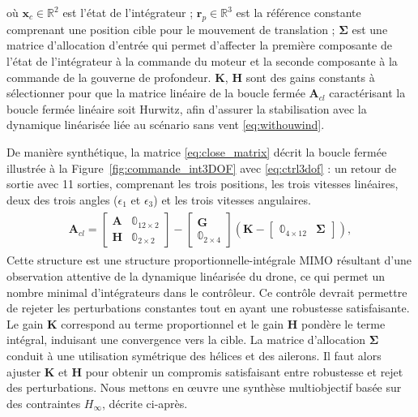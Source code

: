 où $\boldsymbol{x}_{c} \in \mathbb{R}^{2}$ est l'état de l'intégrateur ; $\boldsymbol{r}_{p} \in \mathbb{R}^{3}$ est la référence constante comprenant une position cible pour le mouvement de translation ; $\boldsymbol{\Sigma}$ est une matrice d'allocation d'entrée qui permet d'affecter la première composante de l'état de l'intégrateur à la commande du moteur et la seconde composante à la commande de la gouverne de profondeur. $\boldsymbol{K}$, $\boldsymbol{H}$ sont des gains constants à sélectionner pour que la matrice linéaire de la boucle fermée $\boldsymbol{A}_{cl}$ caractérisant la boucle fermée linéaire soit Hurwitz, afin d'assurer la stabilisation avec la dynamique linéarisée liée au scénario sans vent \eqref{eq:withouwind}.

De manière synthétique, la matrice \eqref{eq:close_matrix} décrit la boucle fermée illustrée à la Figure~\ref{fig:commande_int3DOF} avec \eqref{eq:ctrl3dof} : un retour de sortie avec 11 sorties, comprenant les trois positions, les trois vitesses linéaires, deux des trois angles ($\epsilon_{1}$ et $\epsilon_{3}$) et les trois vitesses angulaires.
\begin{align} \label{eq:close_matrix}
    \begin{gathered}
        \boldsymbol{A}_{cl} \!= \!
        \begin{bmatrix}\boldsymbol{A} & \mathbb{0}_{12\times 2} \\ \boldsymbol{H} & \mathbb{0}_{2\times 2}\end{bmatrix} \!- \!\begin{bmatrix}\boldsymbol{G} \\ \mathbb{0}_{2\times 4}\end{bmatrix} \left( \boldsymbol{K} -  \begin{bmatrix}\mathbb{0}_{4\times 12} & \boldsymbol{\Sigma} \end{bmatrix}\right),
    \end{gathered}
\end{align}
Cette structure est une structure proportionnelle-intégrale MIMO résultant d'une observation attentive de la dynamique linéarisée du drone, ce qui permet un nombre minimal d'intégrateurs dans le contrôleur. Ce contrôle devrait permettre de rejeter les perturbations constantes tout en ayant une robustesse satisfaisante. Le gain $\boldsymbol{K}$ correspond au terme proportionnel et le gain $\boldsymbol{H}$ pondère le terme intégral, induisant une convergence vers la cible. La matrice d'allocation $\boldsymbol{\Sigma}$ conduit à une utilisation symétrique des hélices et des ailerons. Il faut alors ajuster $\boldsymbol{K}$ et $\boldsymbol{H}$ pour obtenir un compromis satisfaisant entre robustesse et rejet des perturbations. Nous mettons en œuvre une synthèse multiobjectif basée sur des contraintes $H_{\infty}$, décrite ci-après.

